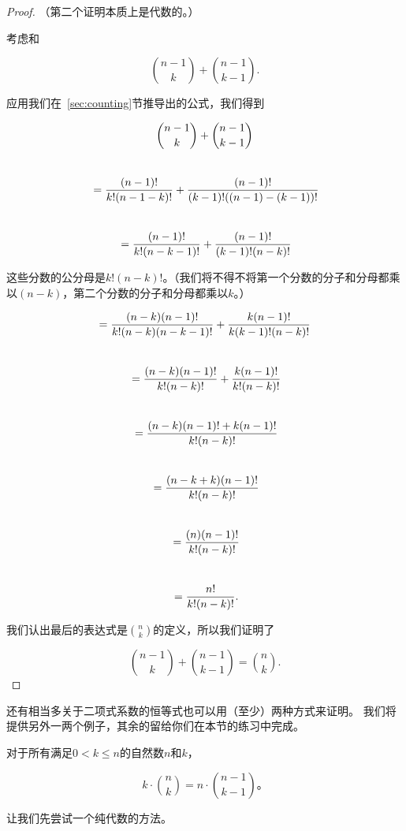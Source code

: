\begin{proof}
（第二个证明本质上是代数的。）

考虑和

\[ \binom{n-1}{k} + \binom{n-1}{k-1}.\]

应用我们在~\ref{sec:counting}节推导出的公式，我们得到

\begin{gather*} 
\binom{n-1}{k} + \binom{n-1}{k-1} \\
\rule{0pt}{36pt} = \frac{(n-1)!}{k! (n-1-k)!}  + \frac{(n-1)!}{(k-1)! ((n-1)-(k-1))!} \\
\rule{0pt}{36pt} = \frac{(n-1)!}{k! (n-k-1)!}  + \frac{(n-1)!}{(k-1)! (n-k)!} \\
\end{gather*}

这些分数的公分母是$k!(n-k)!$。（我们将不得不将第一个分数的分子和分母都乘以$(n-k)$，第二个分数的分子和分母都乘以$k$。）

\begin{gather*} 
= \frac{(n-k)(n-1)!}{k! (n-k) (n-k-1)!}  + \frac{k (n-1)!}{k (k-1)! (n-k)!} \\
\rule{0pt}{36pt} = \frac{(n-k)(n-1)!}{k! (n-k)!}  + \frac{k (n-1)!}{k! (n-k)!} \\
\rule{0pt}{36pt} = \frac{(n-k)(n-1)! + k (n-1)!}{k! (n-k)!} \\
\rule{0pt}{36pt} = \frac{(n-k+k)(n-1)!}{k! (n-k)!} \\
\rule{0pt}{36pt} = \frac{(n)(n-1)!}{k! (n-k)!} \\
\rule{0pt}{36pt} = \frac{n!}{k! (n-k)!}. \\
\end{gather*}

我们认出最后的表达式是$\binom{n}{k}$的定义，所以我们证明了

\[ \binom{n-1}{k} + \binom{n-1}{k-1} = \binom{n}{k}. \]
\end{proof}

还有相当多关于二项式系数的恒等式也可以用（至少）两种方式来证明。
我们将提供另外一两个例子，其余的留给你们在本节的练习中完成。

\begin{thm}
对于所有满足$0 < k \leq n$的自然数$n$和$k$，

\[ k \cdot \binom{n}{k} = n \cdot \binom{n-1}{k-1}。\]
\end{thm}

让我们先尝试一个纯代数的方法。

